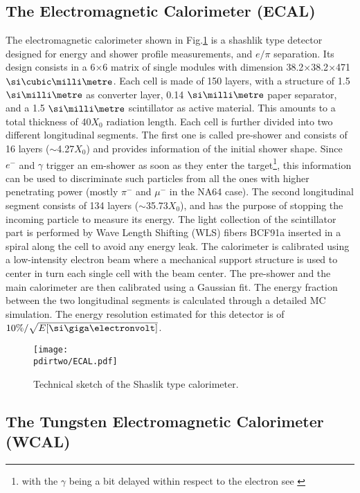 \subsection{The Electromagnetic Calorimeter (ECAL)}
\label{ch2:sec:detectors-ecal}

The electromagnetic calorimeter shown in Fig.\ref{fig:ecal-sketch} is a shashlik type detector designed for energy and shower profile measurements, and $e/\pi$ separation. Its design consists in a 6$\times$6 matrix of single modules with dimension 38.2$\times$38.2$\times$471 $\mmc$. Each cell is made of 150 layers, with a structure of 1.5 $\mmi$ as converter layer, 0.14 $\mmi$ paper separator, and a 1.5 $\mmi$ scintillator as active material. This amounts to a total thickness of 40$X_0$ radiation length. Each cell is further divided into two different longitudinal segments. The first one is called pre-shower and consists of 16 layers ($\sim$4.27$X_0$) and provides information of the initial shower shape. Since $e^-$ and $\gamma$ trigger an em-shower as soon as they enter the target\footnote{with the $\gamma$ being a bit delayed within respect to the electron see \cite{Bichsel:2002cf}}, this information can be used to discriminate such particles from all the ones with higher penetrating power (mostly $\pi^-$ and $\mu^-$ in the NA64 case). The second longitudinal segment consists of 134 layers ($\sim$35.73$X_0$), and has the purpose of stopping the incoming particle to measure its energy. The light collection of the scintillator part is performed by Wave Length Shifting (WLS) fibers BCF91a \cite{wls-fibers} inserted in a spiral along the cell to avoid any energy leak. The calorimeter is calibrated using a low-intensity electron beam where a mechanical support structure is used to center in turn each single cell with the beam center. The pre-shower and the main calorimeter are then calibrated using a Gaussian fit. The energy fraction between the two longitudinal segments is calculated through a detailed MC simulation. The energy resolution estimated for this detector is of $10\% / \sqrt{E[\gev]}$.

\begin{figure}[bth!]
\centering
\texttt{[image: \\pdirtwo/ECAL.pdf]}
\caption[ECAL sketch]{Technical sketch of the Shaslik type calorimeter.}
\label{fig:ecal-sketch}
\end{figure}

\subsection{The Tungsten Electromagnetic Calorimeter (WCAL)}

